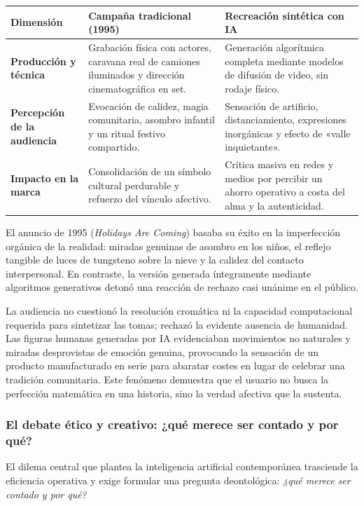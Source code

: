 \begingroup
\small
\renewcommand{\arraystretch}{1.25}
\begin{tabularx}{\linewidth}{@{}>{\raggedright\arraybackslash}p{2.8cm}>{\raggedright\arraybackslash}X>{\raggedright\arraybackslash}X@{}}
\toprule
\textbf{Dimensión} & \textbf{Campaña tradicional (1995)} & \textbf{Recreación sintética con IA} \\
\midrule
\textbf{Producción y técnica} & Grabación física con actores, caravana real de camiones iluminados y dirección cinematográfica en set. & Generación algorítmica completa mediante modelos de difusión de video, sin rodaje físico. \\
\textbf{Percepción de la audiencia} & Evocación de calidez, magia comunitaria, asombro infantil y un ritual festivo compartido. & Sensación de artificio, distanciamiento, expresiones inorgánicas y efecto de «valle inquietante». \\
\textbf{Impacto en la marca} & Consolidación de un símbolo cultural perdurable y refuerzo del vínculo afectivo. & Crítica masiva en redes y medios por percibir un ahorro operativo a costa del alma y la autenticidad. \\
\bottomrule
\end{tabularx}
\endgroup

El anuncio de 1995 (\textit{Holidays Are Coming}) basaba su éxito en la imperfección orgánica de la realidad: miradas genuinas de asombro en los niños, el reflejo tangible de luces de tungsteno sobre la nieve y la calidez del contacto interpersonal. En contraste, la versión generada íntegramente mediante algoritmos generativos detonó una reacción de rechazo casi unánime en el público.

La audiencia no cuestionó la resolución cromática ni la capacidad computacional requerida para sintetizar las tomas; rechazó la evidente ausencia de humanidad. Las figuras humanas generadas por IA evidenciaban movimientos no naturales y miradas desprovistas de emoción genuina, provocando la sensación de un producto manufacturado en serie para abaratar costes en lugar de celebrar una tradición comunitaria. Este fenómeno demuestra que el usuario no busca la perfección matemática en una historia, sino la verdad afectiva que la sustenta.

\clearpage
\subsubsection*{\textcolor{unabblue}{\faCompass}\quad El debate ético y creativo: ¿qué merece ser contado y por qué?}
El dilema central que plantea la inteligencia artificial contemporánea trasciende la eficiencia operativa y exige formular una pregunta deontológica: \textit{¿qué merece ser contado y por qué?}

